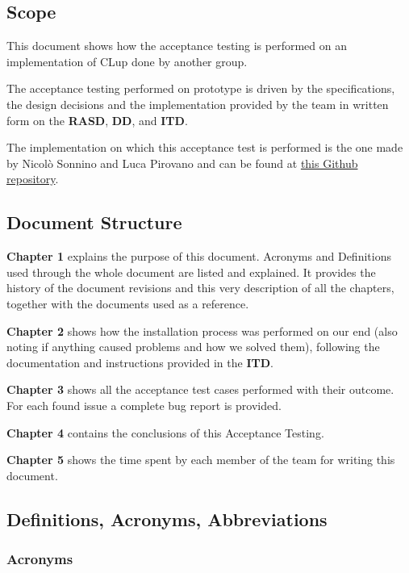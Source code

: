 \subsection{Scope}
This document shows how the acceptance testing is performed on an implementation of CLup done by another group.

The acceptance testing performed on prototype is driven by the specifications, the design decisions and the implementation provided by the team in written form on the \textbf{RASD}, \textbf{DD}, and \textbf{ITD}.

The implementation on which this acceptance test is performed is the one made by Nicolò Sonnino and Luca Pirovano and can be found at \href{https://github.com/PiroX4256/SE2-Piemonti-Pirovano-Sonnino}{this Github repository}.

\subsection{Document Structure}

\textbf{Chapter 1} explains the purpose of this document. Acronyms and Definitions used through the whole document are listed and explained. It provides the history of the document revisions and this very description of all the chapters, together with the documents used as a reference.

\medskip

\textbf{Chapter 2} shows how the installation process was performed on our end (also noting if anything caused problems and how we solved them), following the documentation and instructions provided in the \textbf{ITD}.

\medskip

\textbf{Chapter 3} shows all the acceptance test cases performed with their outcome. For each found issue a complete bug report is provided.

\medskip

\textbf{Chapter 4} contains the conclusions of this Acceptance Testing.

\medskip

\textbf{Chapter 5} shows the time spent by each member of the team for writing this document.

\clearpage
\subsection{Definitions, Acronyms, Abbreviations}

\subsubsection{Acronyms}

